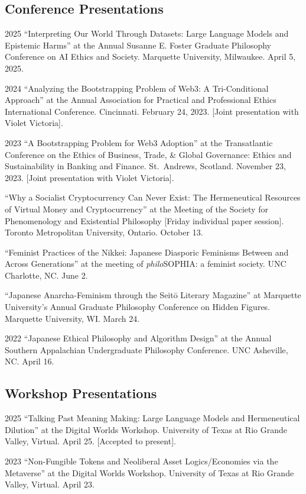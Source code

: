 \documentclass{article}
\begin{document}
\subsection*{\normalsize{Conference Presentations}}
\begin{tablist}
    \item[2025] \tab{}\enquote{Interpreting Our World Through Datasets: Large Language Models and Epistemic Harms} at the  Annual Susanne E. Foster Graduate Philosophy Conference on AI Ethics and Society. Marquette University, Milwaukee. April 5, 2025.
    \item[2024] \tab{}\enquote{Analyzing the Bootstrapping Problem of Web3: A Tri-Conditional Approach} at the  Annual Association for Practical and Professional Ethics International Conference. Cincinnati. February 24, 2023. [Joint presentation with Violet Victoria].
    \item[2023] \tab{}\enquote{A Bootstrapping Problem for Web3 Adoption} at the  Transatlantic Conference on the Ethics of Business, Trade, \& Global Governance: Ethics and Sustainability in Banking and Finance. St.~Andrews, Scotland. November 23, 2023. [Joint presentation with Violet Victoria].
    \item[] \tab{}\enquote{Why a Socialist Cryptocurrency Can Never Exist: The Hermeneutical Resources of Virtual Money and Cryptocurrency} at the  Meeting of the Society for Phenomenology and Existential Philosophy [Friday individual paper session]. Toronto Metropolitan University, Ontario. October 13.
    \item[] \tab{}\enquote{Feminist Practices of the Nikkei: Japanese Diasporic Feminisms Between and Across Generations} at the  meeting of \textit{philo}SOPHIA: a feminist society. UNC Charlotte, NC. June 2.
    \item[] \tab{}\enquote{Japanese Anarcha-Feminism through the Seitō Literary Magazine} at Marquette University's Annual Graduate Philosophy Conference on Hidden Figures. Marquette University, WI. March 24.
    \item[2022] \tab{}\enquote{Japanese Ethical Philosophy and Algorithm Design} at the  Annual Southern Appalachian Undergraduate Philosophy Conference. UNC Asheville, NC. April 16.
\end{tablist}

\subsection*{\normalsize{Workshop Presentations}}
\begin{tablist}
    \item[2025] \tab{}\enquote{Talking Past Meaning Making: Large Language Models and Hermeneutical Dilution} at the Digital Worlds Workshop. University of Texas at Rio Grande Valley, Virtual. April 25. [Accepted to present].
    \item[2023] \tab{}\enquote{Non-Fungible Tokens and Neoliberal Asset Logics/Economies via the Metaverse} at the Digital Worlds Workshop. University of Texas at Rio Grande Valley, Virtual. April 23.
\end{tablist}
\end{document}
